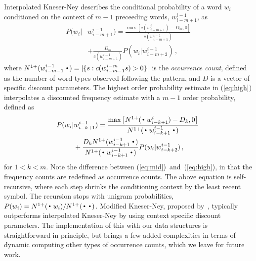 Interpolated Kneser-Ney describes the conditional probability of a word $w_i$ conditioned on the context of $m-1$ preceeding words, $w_{i-m+1}^{i-1}$, as 
\begin{align}
\! P(w_i |& w_{i-m+1}^{i-1})
 = \frac{\max\left[c(w^{i}_{i-m+1}) - D_m,0\right]}{c(w^{i-1}_{i-m+1})} \nonumber \\
& +\frac{D_m }{c(w^{i-1}_{i-m+1})}  P(w_i | w_{i-m+2}^{i-1}) \, , \label{eq:high}
\end{align}
where \mbox{$\nlplus{w^{i-1}_{i-m-1}\Bigcdot} = |\{s: c(w^{i-m}_{i-m-1}s)>0\}|$} is the \emph{occurrence count}, defined as the number of word types observed following the pattern, and $D$ is a vector of \ngram specific discount parameters.
The highest order probability estimate in (\ref{eq:high}) interpolates a discounted frequency estimate with a $m-1$ order probability, defined as 
\begin{align}
\! P(w_i |& w_{i-k+1}^{i-1})
 = \frac{\max\left[\nlplus{\Bigcdot w_{i-k+1}^{i}} - D_k,0\right]}{\nlplus{\Bigcdot w_{i-k+1}^{i-1} \Bigcdot}} \nonumber \\
&+ \frac{D_k \nlplus{w_{i-k+1}^{i-1}\Bigcdot}}{\nlplus{\Bigcdot w_{i-k+1}^{i-1} \Bigcdot}} P(w_i | w_{i-k+2}^{i-1}) \, , \! \label{eq:mid}
\end{align}
for $1<k<m$. 
Note the difference between (\ref{eq:mid})~and~(\ref{eq:high}), in that the frequency counts are redefined as occurrence counts. 
The above equation is self-recursive, where each step shrinks the conditioning context by the least recent symbol. 
The recursion stops with unigram probabilities,
%
$ P(w_i) = \nlplus{\Bigcdot w_i} / \nlplus{\Bigcdot\Bigcdot}$.
Modified Kneser-Ney, proposed by~, typically outperforms interpolated Kneser-Ney by using context specific discount parameters.
The implementation of this with our data structures is straightforward in principle, but brings a few added complexities in terms of dynamic computing other types of occurrence counts, which we leave for future work.


